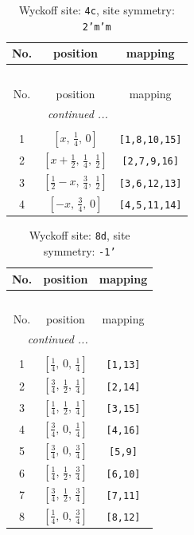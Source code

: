 \documentclass[fleqn,8pt]{jsarticle}
\begin{document}
\renewcommand{\arraystretch}{1.2}
\begin{longtable}{ccc}
\caption{Wyckoff site: {\tt 4c}, site symmetry: {\tt 2'm'm}}
 \\
 \hline \hline
No. & position & mapping \\ \hline \endfirsthead

\multicolumn{2}{l}{\tablename\ \thetable{}} \\
 \hline \hline
No. & position & mapping \\ \hline \endhead

 \hline \hline
\multicolumn{2}{r}{\footnotesize\it continued ...} \\ \endfoot

 \hline \hline
\multicolumn{2}{r}{} \\ \endlastfoot

1 & $\left[ x,\, \frac{1}{4},\, 0 \right]$ & {\tt [1,8,10,15]} \\ \hline
2 & $\left[ x + \frac{1}{2},\, \frac{1}{4},\, \frac{1}{2} \right]$ & {\tt [2,7,9,16]} \\ \hline
3 & $\left[ \frac{1}{2} - x,\, \frac{3}{4},\, \frac{1}{2} \right]$ & {\tt [3,6,12,13]} \\ \hline
4 & $\left[ - x,\, \frac{3}{4},\, 0 \right]$ & {\tt [4,5,11,14]} \\
\end{longtable}
\renewcommand{\arraystretch}{1.2}
\begin{longtable}{ccc}
\caption{Wyckoff site: {\tt 8d}, site symmetry: {\tt -1'}}
 \\
 \hline \hline
No. & position & mapping \\ \hline \endfirsthead

\multicolumn{2}{l}{\tablename\ \thetable{}} \\
 \hline \hline
No. & position & mapping \\ \hline \endhead

 \hline \hline
\multicolumn{2}{r}{\footnotesize\it continued ...} \\ \endfoot

 \hline \hline
\multicolumn{2}{r}{} \\ \endlastfoot

1 & $\left[ \frac{1}{4},\, 0,\, \frac{1}{4} \right]$ & {\tt [1,13]} \\ \hline
2 & $\left[ \frac{3}{4},\, \frac{1}{2},\, \frac{1}{4} \right]$ & {\tt [2,14]} \\ \hline
3 & $\left[ \frac{1}{4},\, \frac{1}{2},\, \frac{1}{4} \right]$ & {\tt [3,15]} \\ \hline
4 & $\left[ \frac{3}{4},\, 0,\, \frac{1}{4} \right]$ & {\tt [4,16]} \\ \hline
5 & $\left[ \frac{3}{4},\, 0,\, \frac{3}{4} \right]$ & {\tt [5,9]} \\ \hline
6 & $\left[ \frac{1}{4},\, \frac{1}{2},\, \frac{3}{4} \right]$ & {\tt [6,10]} \\ \hline
7 & $\left[ \frac{3}{4},\, \frac{1}{2},\, \frac{3}{4} \right]$ & {\tt [7,11]} \\ \hline
8 & $\left[ \frac{1}{4},\, 0,\, \frac{3}{4} \right]$ & {\tt [8,12]} \\
\end{longtable}
\end{document}
